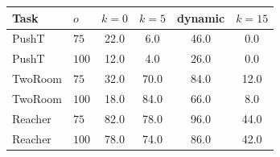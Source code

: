 \begin{tabular}{llcccc}
\toprule
Task & $o$ & $k{=}0$ & $k{=}5$ & dynamic & $k{=}15$ \\
\midrule
PushT & $75$ & 22.0 & 6.0 & 46.0 & 0.0 \\
PushT & $100$ & 12.0 & 4.0 & 26.0 & 0.0 \\
\midrule
TwoRoom & $75$ & 32.0 & 70.0 & 84.0 & 12.0 \\
TwoRoom & $100$ & 18.0 & 84.0 & 66.0 & 8.0 \\
\midrule
Reacher & $75$ & 82.0 & 78.0 & 96.0 & 44.0 \\
Reacher & $100$ & 78.0 & 74.0 & 86.0 & 42.0 \\
\bottomrule
\end{tabular}
